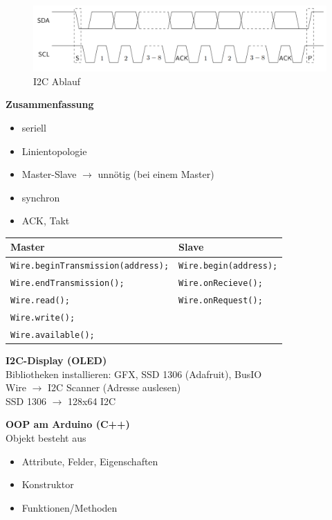 \begin{figure}[H]
	\centering
	\includegraphics[width=0.8\linewidth]{figures/i2cablauf.png}
	\caption{I2C Ablauf}
\end{figure}

\textbf{Zusammenfassung}
\begin{itemize}
	\item seriell
	\item Linientopologie
	\item Master-Slave $\rightarrow$ unnötig (bei einem Master)
	\item synchron
	\item ACK, Takt
\end{itemize}

\begin{tabular}{ | p{} | p{} |} \hline
	\textbf{Master} & \textbf{Slave} \\ \hline
	\texttt{Wire.beginTransmission(address);} & \texttt{Wire.begin(address);} \\
	\texttt{Wire.endTransmission();} & \texttt{Wire.onRecieve();} \\
	\texttt{Wire.read();} & \texttt{Wire.onRequest();} \\
	\texttt{Wire.write();} &  \\
	\texttt{Wire.available();} &  \\
	\hline
\end{tabular} 

\textbf{I2C-Display (OLED)} \\
Bibliotheken installieren: GFX, SSD 1306 (Adafruit), BusIO \\
Wire $\rightarrow$ I2C Scanner (Adresse auslesen) \\
SSD 1306 $\rightarrow$ 128x64 I2C 

\textbf{OOP am Arduino (C++)} \\
Objekt besteht aus
\begin{itemize}
	\item Attribute, Felder, Eigenschaften
	\item Konstruktor
	\item Funktionen/Methoden
\end{itemize}











